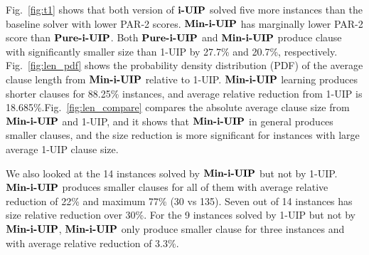 Fig.~\ref{fig:t1} shows that both version of $\textbf{i-UIP}$ solved five more instances than the baseline solver with lower PAR-2 scores. $\textbf{Min-i-UIP}$ has marginally lower PAR-2 score than $\textbf{Pure-i-UIP}$. Both $\textbf{Pure-i-UIP}$ and $\textbf{Min-i-UIP}$ produce clause with significantly smaller size than 1-UIP by 27.7\% and 20.7\%, respectively. Fig.~\ref{fig:len_pdf} shows the probability density distribution (PDF) of the average clause length from $\textbf{Min-i-UIP}$ relative to 1-UIP. $\textbf{Min-i-UIP}$ learning produces shorter clauses for 88.25\% instances, and average relative reduction from 1-UIP is 18.685\%.Fig.~\ref{fig:len_compare} compares the absolute average clause size from $\textbf{Min-i-UIP}$ and 1-UIP, and it shows that $\textbf{Min-i-UIP}$ in general produces smaller clauses, and the size reduction is more significant for instances with large average 1-UIP clause size. 

We also looked at the 14 instances solved by $\textbf{Min-i-UIP}$ but not by 1-UIP. $\textbf{Min-i-UIP}$ produces smaller clauses for all of them with average relative reduction of 22\% and maximum 77\% (30 vs 135). Seven out of 14 instances has size relative reduction over 30\%. For the 9 instances solved by 1-UIP but not by $\textbf{Min-i-UIP}$, $\textbf{Min-i-UIP}$ only produce smaller clause for three instances and with average relative reduction of 3.3\%.



